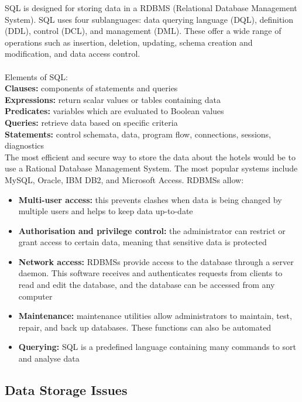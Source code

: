 \documentclass[12pt]{article}
\begin{document}
SQL is designed for storing data in a RDBMS (Relational Database Management System). SQL uses four sublanguages: data querying language (DQL), definition (DDL), control (DCL), and management (DML). These offer a wide range of operations such as insertion, deletion, updating, schema creation and modification, and data access control. \\ 
\\ Elements of SQL: \\
\textbf{Clauses:} components of statements and queries \\
\textbf{Expressions:} return scalar values or tables containing data \\
\textbf{Predicates:} variables which are evaluated to Boolean values \\
\textbf{Queries:} retrieve data based on specific criteria \\
\textbf{Statements:} control schemata, data, program flow, connections, sessions, diagnostics \\

The most efficient and secure way to store the data about the hotels would be to use a Rational Database Management System. The most popular systems include MySQL, Oracle, IBM DB2, and Microsoft Access. RDBMSs allow:

\begin{itemize}
\item 
\textbf{Multi-user access:} this prevents clashes when data is being changed by multiple users and helps to keep data up-to-date
\item
\textbf{Authorisation and privilege control:} the administrator can restrict or grant access to certain data, meaning that sensitive data is protected
\item
\textbf{Network access:} RDBMSs provide access to the database through a server daemon. This software receives and authenticates requests from clients to read and edit the database, and the database can be accessed from any computer
\item
\textbf{Maintenance:} maintenance utilities allow administrators to maintain, test, repair, and back up databases. These functions can also be automated
\item
\textbf{Querying:} SQL is a predefined language containing many commands to sort and analyse data
\end{itemize}

\subsection{Data Storage Issues}
\end{document}
